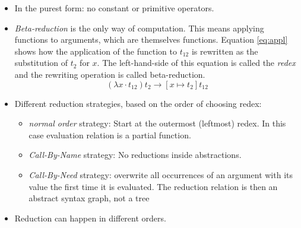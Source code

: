 \documentclass[fleqn]{article}
\begin{document}
\begin{itemize}
	\begin{itemize}
		\item In the purest form: no constant or primitive operators. 
		\item \emph{Beta-reduction} is the only way of computation. This means applying functions to 
		arguments, which are themselves functions. Equation 
		\ref{eq:appl} shows how the application of the function to $t_{12}$ is rewritten as the substitution 
		of $t_2$ for $x$. The left-hand-side of this equation is called the \emph{redex} and the rewriting 
		operation is called beta-reduction. 
		\begin{equation}\label{eq:appl}
		(\lambda x \cdot t_{12}) t_2 \to [x \mapsto t_2] t_{12}
		\end{equation}
		\item Different reduction strategies, based on the order of choosing redex: 
		\begin{itemize}
			\item \emph{normal order} strategy: Start at the outermost (leftmost) redex. In this case 
			evaluation relation is a partial function.
			\item \emph{Call-By-Name} strategy: No reductions inside abstractions. 
			\item \emph{Call-By-Need} strategy: overwrite all occurrences of an argument with its value the 
			first time it is evaluated. The reduction relation is then an abstract syntax graph, not a tree 
		\end{itemize}
		\item Reduction can happen in different orders. 
		
	\end{itemize}
\end{itemize}
\end{document}
